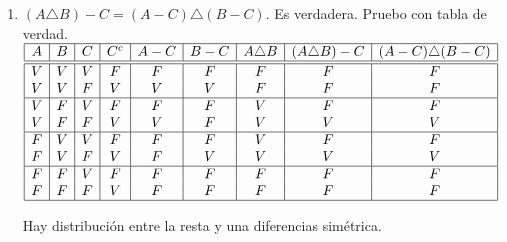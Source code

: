 \begin{enumerate}[label=\roman*)]
  \item $(A \triangle B) - C = (A-C) \triangle (B - C)$. Es verdadera. Pruebo con tabla de verdad.\\
        $
          \begin{array}{|c|c|c|c|c|c|c|c|c|}
            \hline
            A & B & C & C^c & A - C & B - C & A \triangle B & (A \triangle B) - C & (A - C) \triangle (B - C) \\
            \hline  \hline
            V & V & V & F   & F     & F     & F             & F                   & F                         \\
            V & V & F & V   & V     & V     & F             & F                   & F                         \\
            \hline
            V & F & V & F   & F     & F     & V             & F                   & F                         \\
            V & F & F & V   & V     & F     & V             & V                   & V                         \\
            \hline
            F & V & V & F   & F     & F     & V             & F                   & F                         \\
            F & V & F & V   & F     & V     & V             & V                   & V                         \\
            \hline
            F & F & V & F   & F     & F     & F             & F                   & F                         \\
            F & F & F & V   & F     & F     & F             & F                   & F                         \\
            \hline
          \end{array}
        $\par
        Hay distribución entre la resta y una diferencias simétrica.


\end{enumerate}
